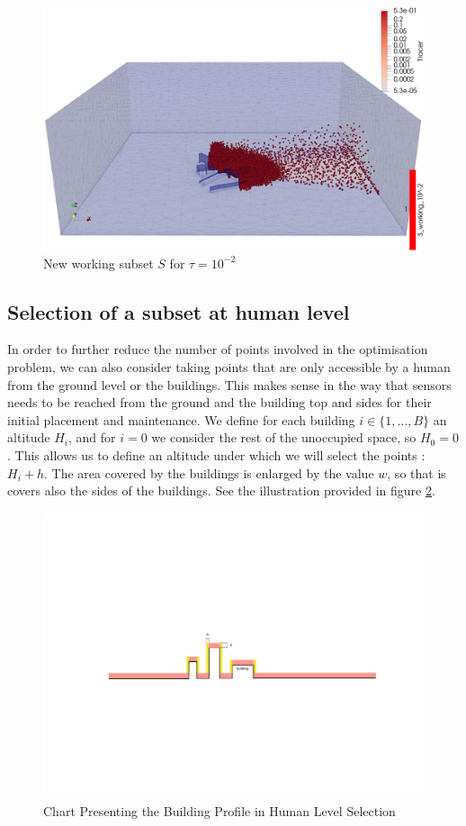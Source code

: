 \begin{figure}[h]
\centering
	\includegraphics[width = 0.8 \textwidth]{figures/Subset/working_subset_10^-2}
	\caption{New working subset $S$ for $\tau = 10^{-2}$}
	\label{fig:working_subset}
\end{figure}

\subsection{Selection of a subset at human level}

In order to further reduce the number of points involved in the optimisation problem, we can also consider taking points that are only accessible by a human from the ground level or the buildings. This makes sense in the way that sensors needs to be reached from the ground and the  building top and sides for their initial placement and maintenance. We define for each building $i \in \{1, \dots, B\}$ an altitude $H_i$, and for $i = 0$ we consider the rest of the unoccupied space, so $H_0 = 0$. This allows us to define an altitude under which we will select the points : $H_i + h$. The area covered by the buildings is enlarged by the value $w$, so that is covers also the sides of the buildings. See the illustration provided in figure \ref{fig:humanchart}. \\

\begin{figure}[h]
\centering
	\includegraphics[width = 0.6 \textwidth]{figures/Subset/HumanSelection_chart}
	\caption{Chart Presenting the Building Profile in Human Level Selection}
	\label{fig:humanchart}
\end{figure}

